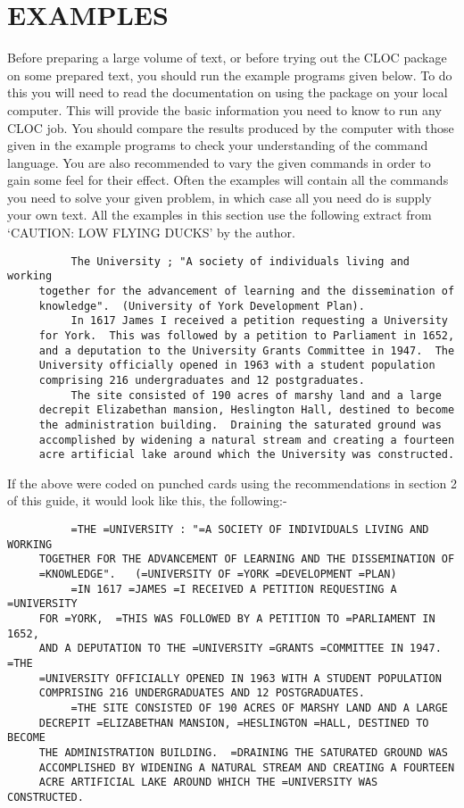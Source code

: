 \newpage
\appendix
\section{EXAMPLES}
 Before preparing a large volume of text, or before trying out the
 CLOC package on some prepared text, you should run the example
 programs given below.  To do this you will need to read the
 documentation on using the package on your local computer.  This
 will provide the basic information you need to know to run any CLOC
 job.  You should compare the results produced by the computer with
 those given in the example programs to check your understanding of
 the command language.  You are also recommended to vary the given
 commands in order to gain some feel for their effect.  Often
 the examples will contain all the commands you need to solve
 your given problem, in which case all you need do is supply
 your own text.
 All the examples in this section use the following extract from
 `CAUTION: LOW FLYING DUCKS' by the author.

\begin{verbatim}
          The University ; "A society of individuals living and working
     together for the advancement of learning and the dissemination of
     knowledge".  (University of York Development Plan).
          In 1617 James I received a petition requesting a University
     for York.  This was followed by a petition to Parliament in 1652,
     and a deputation to the University Grants Committee in 1947.  The
     University officially opened in 1963 with a student population
     comprising 216 undergraduates and 12 postgraduates.
          The site consisted of 190 acres of marshy land and a large
     decrepit Elizabethan mansion, Heslington Hall, destined to become
     the administration building.  Draining the saturated ground was
     accomplished by widening a natural stream and creating a fourteen
     acre artificial lake around which the University was constructed.
\end{verbatim}

 If the above were coded on punched cards using the recommendations in
 section 2 of this guide, it would look like this, the following:-

\begin{verbatim}
          =THE =UNIVERSITY : "=A SOCIETY OF INDIVIDUALS LIVING AND WORKING
     TOGETHER FOR THE ADVANCEMENT OF LEARNING AND THE DISSEMINATION OF
     =KNOWLEDGE".   (=UNIVERSITY OF =YORK =DEVELOPMENT =PLAN)  
          =IN 1617 =JAMES =I RECEIVED A PETITION REQUESTING A =UNIVERSITY
     FOR =YORK,  =THIS WAS FOLLOWED BY A PETITION TO =PARLIAMENT IN 1652,
     AND A DEPUTATION TO THE =UNIVERSITY =GRANTS =COMMITTEE IN 1947.  =THE
     =UNIVERSITY OFFICIALLY OPENED IN 1963 WITH A STUDENT POPULATION
     COMPRISING 216 UNDERGRADUATES AND 12 POSTGRADUATES.
          =THE SITE CONSISTED OF 190 ACRES OF MARSHY LAND AND A LARGE
     DECREPIT =ELIZABETHAN MANSION, =HESLINGTON =HALL, DESTINED TO BECOME
     THE ADMINISTRATION BUILDING.  =DRAINING THE SATURATED GROUND WAS
     ACCOMPLISHED BY WIDENING A NATURAL STREAM AND CREATING A FOURTEEN
     ACRE ARTIFICIAL LAKE AROUND WHICH THE =UNIVERSITY WAS CONSTRUCTED.
\end{verbatim}

